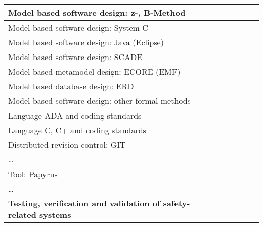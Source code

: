 \documentclass[a4paper, 11pt]{article}
\begin{document}
\begin{center}
\begin{longtable}{|r|r|r|r|r|r|r|r|}
    \hline
    \multicolumn{1}{|l|}{Model based software design: z-, B-Method} & \multicolumn{1}{l|}{} &       &       &       &       &       &  \bigstrut\\
    \hline
    \multicolumn{1}{|l|}{Model based software design: System C} & \multicolumn{1}{l|}{} &       &       &       &       &       &  \bigstrut\\
    \hline
    \multicolumn{1}{|l|}{Model based software design: Java (Eclipse)} & \multicolumn{1}{l|}{} &       &       &       &       &       &  \bigstrut\\
    \hline
    \multicolumn{1}{|l|}{Model based software design: SCADE} & \multicolumn{1}{l|}{} &       &       &       &       &       &  \bigstrut\\
    \hline
    \multicolumn{1}{|l|}{Model based metamodel design: ECORE (EMF)} & \multicolumn{1}{l|}{} &       &       &       &       &       &  \bigstrut\\
    \hline
    \multicolumn{1}{|l|}{Model based database design: ERD} & \multicolumn{1}{l|}{} &       &       &       &       &       &  \bigstrut\\
    \hline
    \multicolumn{1}{|l|}{Model based software design: other formal methods} & \multicolumn{1}{l|}{} &       &       &       &       &       &  \bigstrut\\
    \hline
    \multicolumn{1}{|l|}{Language ADA and coding standards} & \multicolumn{1}{l|}{} &       &       &       &       &       &  \bigstrut\\
    \hline
    \multicolumn{1}{|l|}{Language C, C+ and coding standards} & \multicolumn{1}{l|}{} &       &       &       &       &       &  \bigstrut\\
    \hline
    \multicolumn{1}{|l|}{Distributed revision control: GIT} & \multicolumn{1}{l|}{} &       &       &       &       &       &  \bigstrut\\
    \hline
    \multicolumn{1}{|l|}{…} & \multicolumn{1}{l|}{} &       &       &       &       &       &  \bigstrut\\
    \hline
    \multicolumn{1}{|l|}{Tool: Papyrus} & \multicolumn{1}{l|}{} &       &       &       &       &       &  \bigstrut\\
    \hline
    \multicolumn{1}{|l|}{…} & \multicolumn{1}{l|}{} &       &       &       &       &       &  \bigstrut[t]\\
    \multicolumn{1}{|l|}{\textbf{Testing, verification and validation of safety-related systems}} & \multicolumn{1}{l|}{\textbf{}} &       &       &       &       &       &  \\

\end{longtable}
\end{center}
\end{document}
